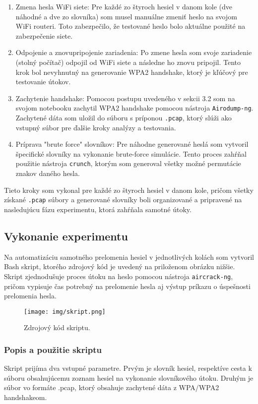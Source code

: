 \documentclass[12pt, twoside]{book}
\begin{document}
\begin{enumerate} 
\item Zmena hesla WiFi siete: Pre každé zo štyroch hesiel v danom kole (dve náhodné a dve zo slovníka) som musel manuálne zmeniť heslo na svojom WiFi routeri. Toto zabezpečilo, že testované heslo bolo aktuálne použité na zabezpečenie siete.

\item Odpojenie a znovupripojenie zariadenia: Po zmene hesla som svoje zariadenie (stolný počítač) odpojil od WiFi siete a následne ho znovu pripojil. Tento krok bol nevyhnutný na generovanie WPA2 handshake, ktorý je kľúčový pre testovanie útokov.

\item Zachytenie handshake: Pomocou postupu uvedeného v sekcii 3.2 som na svojom notebooku zachytil WPA2 handshake pomocou nástroja \texttt{Airodump-ng}. Zachytené dáta som uložil do súboru s príponou \texttt{.pcap}, ktorý slúži ako vstupný súbor pre ďalšie kroky analýzy a testovania.

\item Príprava "brute force" slovníkov: Pre náhodne generované heslá som vytvoril špecifické slovníky na vykonanie brute-force simulácie. Tento proces zahŕňal použitie nástroja \texttt{crunch}, ktorým som generoval všetky možné permutácie znakov daného hesla.
\end{enumerate}

Tieto kroky som vykonal pre každé zo štyroch hesiel v danom kole, pričom všetky získané \texttt{.pcap} súbory a generované slovníky boli organizované a pripravené na nasledujúcu fázu experimentu, ktorá zahŕňala samotné útoky.

\subsection{Vykonanie experimentu}
Na automatizáciu samotného prelomenia hesiel v jednotlivých kolách som vytvoril Bash skript, ktorého zdrojový kód je uvedený na priloženom obrázku nižšie. Skript zjednodušuje proces útoku na heslo pomocou nástroja \texttt{aircrack-ng}, pričom vypisuje čas potrebný na prelomenie hesla aj výstup príkazu o úspešnosti prelomenia hesla.

\begin{figure}[H] 
    \centering
    \texttt{[image: img/skript.png]}
    \caption{Zdrojový kód skriptu.}
    \label{fig:skript}
\end{figure}

\subsubsection{Popis a použitie skriptu} 
Skript prijíma dva vstupné parametre. Prvým je slovník hesiel, respektíve cesta k súboru obsahujúcemu zoznam hesiel na vykonanie slovníkového útoku. Druhým je súbor vo formáte .pcap, ktorý obsahuje zachytené dáta z WPA/WPA2 handshakeom. 
\end{document}
